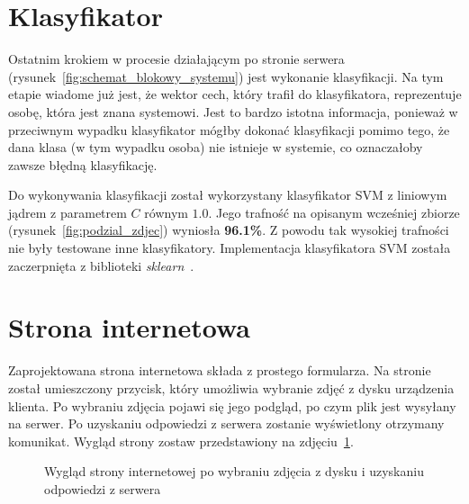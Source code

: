 \pagebreak


\section{Klasyfikator}

Ostatnim krokiem w procesie działającym po stronie serwera (rysunek~\ref{fig:schemat_blokowy_systemu})
jest wykonanie klasyfikacji.
Na tym etapie wiadome już jest, że wektor cech, który trafił do klasyfikatora, reprezentuje osobę,
która jest znana systemowi.
Jest to bardzo istotna informacja, ponieważ w przeciwnym wypadku klasyfikator
mógłby dokonać klasyfikacji pomimo tego, że dana klasa (w tym wypadku osoba) nie istnieje w systemie,
co oznaczałoby zawsze błędną klasyfikację.

Do wykonywania klasyfikacji został wykorzystany klasyfikator SVM z liniowym jądrem z parametrem $C$ równym $1.0$.
Jego trafność na opisanym wcześniej zbiorze (rysunek~\ref{fig:podzial_zdjec}) wyniosła \textbf{96.1\%}.
Z powodu tak wysokiej trafności nie były testowane inne klasyfikatory.
Implementacja klasyfikatora SVM została zaczerpnięta z biblioteki \textit{sklearn}~\cite{sklearn_api}.


\section{Strona internetowa}

Zaprojektowana strona internetowa składa z prostego formularza.
Na stronie został umieszczony przycisk, który umożliwia wybranie zdjęć z dysku urządzenia klienta.
Po wybraniu zdjęcia pojawi się jego podgląd, po czym plik jest wysyłany na serwer.
Po uzyskaniu odpowiedzi z serwera zostanie wyświetlony otrzymany komunikat.
Wygląd strony zostaw przedstawiony na zdjęciu~\ref{fig:ja}.

\begin{figure}[H]
    \centering
    \caption{Wygląd strony internetowej po wybraniu zdjęcia z dysku i uzyskaniu odpowiedzi z serwera}
    \customsource
    \label{fig:ja}
\end{figure}
